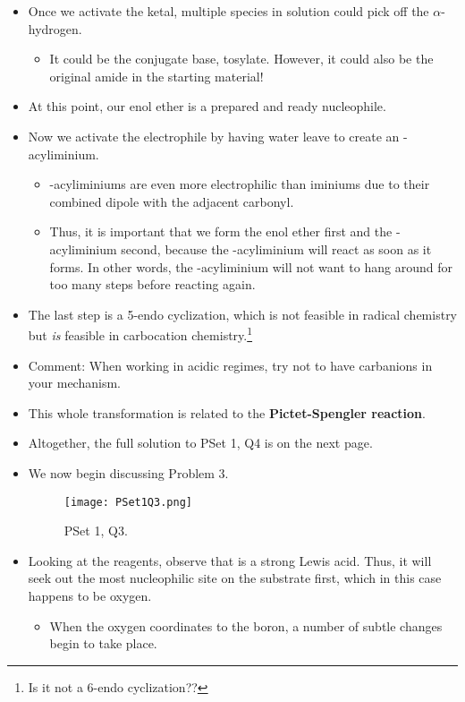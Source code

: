 \documentclass[../notes.tex]{subfiles}
\begin{document}
\begin{itemize}
    \item Once we activate the ketal, multiple species in solution could pick off the $\alpha$-hydrogen.
    \begin{itemize}
        \item It could be the conjugate base, tosylate. However, it could also be the original amide in the starting material!
    \end{itemize}
    \item At this point, our enol ether is a prepared and ready nucleophile.
    \item Now we activate the electrophile by having water leave to create an -acyliminium.
    \begin{itemize}
        \item {}-acyliminiums are even more electrophilic than iminiums due to their combined dipole with the adjacent carbonyl.
        \item Thus, it is important that we form the enol ether first and the -acyliminium second, because the -acyliminium will react as soon as it forms. In other words, the -acyliminium will not want to hang around for too many steps before reacting again.
    \end{itemize}
    \item The last step is a 5-endo cyclization, which is not feasible in radical chemistry but \emph{is} feasible in carbocation chemistry.\footnote{Is it not a 6-endo cyclization??}
    \item Comment: When working in acidic regimes, try not to have carbanions in your mechanism.
    \item This whole transformation is related to the \textbf{Pictet-Spengler reaction}.
    \item Altogether, the full solution to PSet 1, Q4 is on the next page.
    
    \item We now begin discussing Problem 3.
    \begin{figure}[h!]
        \centering
        \texttt{[image: PSet1Q3.png]}
        \caption{PSet 1, Q3.}
        \label{fig:PSet1Q3}
    \end{figure}
    \item Looking at the reagents, observe that  is a strong Lewis acid. Thus, it will seek out the most nucleophilic site on the substrate first, which in this case happens to be oxygen.
    \begin{itemize}
        \item When the oxygen coordinates to the boron, a number of subtle changes begin to take place.

\end{itemize}
\end{itemize}
\end{document}
